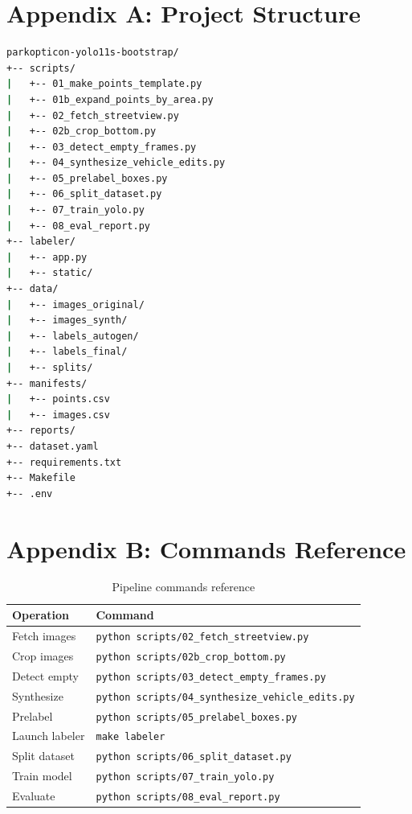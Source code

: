 \documentclass[12pt,a4paper]{article}
\begin{document}
\section*{Appendix A: Project Structure}

\begin{lstlisting}[language=bash]
parkopticon-yolo11s-bootstrap/
+-- scripts/
|   +-- 01_make_points_template.py
|   +-- 01b_expand_points_by_area.py
|   +-- 02_fetch_streetview.py
|   +-- 02b_crop_bottom.py
|   +-- 03_detect_empty_frames.py
|   +-- 04_synthesize_vehicle_edits.py
|   +-- 05_prelabel_boxes.py
|   +-- 06_split_dataset.py
|   +-- 07_train_yolo.py
|   +-- 08_eval_report.py
+-- labeler/
|   +-- app.py
|   +-- static/
+-- data/
|   +-- images_original/
|   +-- images_synth/
|   +-- labels_autogen/
|   +-- labels_final/
|   +-- splits/
+-- manifests/
|   +-- points.csv
|   +-- images.csv
+-- reports/
+-- dataset.yaml
+-- requirements.txt
+-- Makefile
+-- .env
\end{lstlisting}

\section*{Appendix B: Commands Reference}

\begin{table}[H]
	\centering
	\begin{tabular}{ll}
		\toprule
		\textbf{Operation} & \textbf{Command}                                          \\
		\midrule
		Fetch images       & \texttt{python scripts/02\_fetch\_streetview.py}          \\
		Crop images        & \texttt{python scripts/02b\_crop\_bottom.py}              \\
		Detect empty       & \texttt{python scripts/03\_detect\_empty\_frames.py}      \\
		Synthesize         & \texttt{python scripts/04\_synthesize\_vehicle\_edits.py} \\
		Prelabel           & \texttt{python scripts/05\_prelabel\_boxes.py}            \\
		Launch labeler     & \texttt{make labeler}                                     \\
		Split dataset      & \texttt{python scripts/06\_split\_dataset.py}             \\
		Train model        & \texttt{python scripts/07\_train\_yolo.py}                \\
		Evaluate           & \texttt{python scripts/08\_eval\_report.py}               \\
		\bottomrule
	\end{tabular}
	\caption{Pipeline commands reference}
\end{table}
\end{document}

